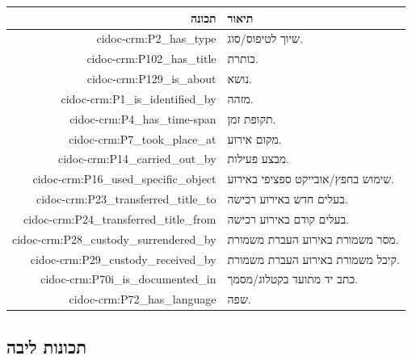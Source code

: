 \begin{longtable}{|r|p{8cm}|}
\hline
\textbf{תכונה} & \textbf{תיאור} \\
\hline
\endhead

cidoc-crm:P2\_has\_type & שיוך לטיפוס/סוג.\\
\hline
cidoc-crm:P102\_has\_title & כותרת.\\
\hline
cidoc-crm:P129\_is\_about & נושא.\\
\hline
cidoc-crm:P1\_is\_identified\_by & מזהה.\\
\hline
cidoc-crm:P4\_has\_time-span & תקופת זמן.\\
\hline
cidoc-crm:P7\_took\_place\_at & מקום אירוע.\\
\hline
cidoc-crm:P14\_carried\_out\_by & מבצע פעילות.\\
\hline
cidoc-crm:P16\_used\_specific\_object & שימוש בחפץ/אובייקט ספציפי באירוע.\\
\hline
cidoc-crm:P23\_transferred\_title\_to & בעלים חדש באירוע רכישה.\\
\hline
cidoc-crm:P24\_transferred\_title\_from & בעלים קודם באירוע רכישה.\\
\hline
cidoc-crm:P28\_custody\_surrendered\_by & מסר משמורת באירוע העברת משמורת.\\
\hline
cidoc-crm:P29\_custody\_received\_by & קיבל משמורת באירוע העברת משמורת.\\
\hline
cidoc-crm:P70i\_is\_documented\_in & כתב יד מתועד בקטלוג/מסמך.\\
\hline
cidoc-crm:P72\_has\_language & שפה.\\
\hline
\end{longtable}

\subsection{תכונות ליבה}

